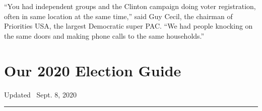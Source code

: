 ``You had independent groups and the Clinton campaign doing voter
registration, often in same location at the same time,'' said Guy Cecil,
the chairman of Priorities USA, the largest Democratic super PAC. ``We
had people knocking on the same doors and making phone calls to the same
households.''

\hypertarget{our-2020-election-guide}{%
\section{Our 2020 Election Guide}\label{our-2020-election-guide}}

Updated ~Sept. 8, 2020

\begin{center}\rule{0.5\linewidth}{\linethickness}\end{center}

